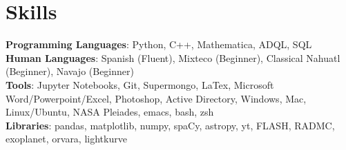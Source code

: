 \documentclass[a4paper,11pt]{article}
\begin{document}
\section{Skills}
 \begin{itemize}[leftmargin=0.15in, label={}]
    \small{\item{
     \textbf{Programming Languages}{: Python, C++, Mathematica, ADQL, SQL} \\
     \vspace{1mm}
     \textbf{Human Languages}{: Spanish (Fluent), Mixteco (Beginner), Classical Nahuatl (Beginner), Navajo (Beginner)} \\
     \vspace{1mm}
     \textbf{Tools}{: Jupyter Notebooks, Git, Supermongo, LaTex, Microsoft Word/Powerpoint/Excel, Photoshop, Active Directory, Windows, Mac, Linux/Ubuntu, NASA Pleiades, emacs, bash, zsh} \\
     \vspace{1mm}
     \textbf{Libraries}{: pandas, matplotlib, numpy, spaCy, astropy, yt, FLASH, RADMC, exoplanet, orvara, lightkurve}
     }
     }
 \end{itemize}


%
\iffalse
\section{Technical Skills}
 \begin{itemize}[leftmargin=0.15in, label={}]
    \small{\item{
     \textbf{Programming Languages}{: Python, C++} \\
     \textbf{Frameworks}{: WordPress} \\
     \textbf{Developer Tools}{: Jupyter Notebooks, Git} \\
     \textbf{Libraries}{: pandas, matplotlib}
    }}
 \end{itemize}
\fi

\end{document}
